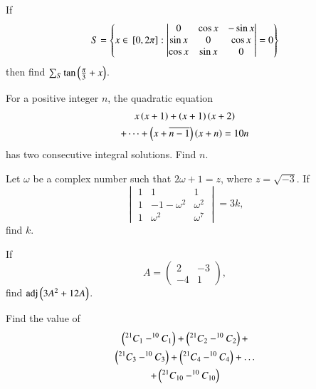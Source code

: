 \documentclass[journal,12pt,twocolumn]{IEEEtran}
\begin{document}
\begin{problem}
If
\begin{equation}
S = \left\{x \in {}\left[0,2\pi\right]: 
\begin{vmatrix}
0 & \cos x & -\sin x
\\
\sin x & 0 & \cos x
\\
\cos x & \sin x & 0
\end{vmatrix}=0\right\}
\end{equation}
then find
$\sum_{S}\tan\left(\frac{\pi}{3}+x\right)$.
\end{problem}
\begin{problem}
For a positive integer $n$, the quadratic equation 
\begin{multline}
x\left(x+1\right)+\left(x+1\right)\left(x+2\right)
\\
+\dots + \left(x + \overline{n-1}\right)\left(x+n\right) = 10n
\end{multline}
has two consecutive integral solutions.    Find $n$.
\end{problem}
%
%
\begin{problem}
Let $\omega$ be a complex number such that $2\omega + 1=z$, where $z = \sqrt{-3}$.  If
%
\begin{equation}
\begin{vmatrix}
1 & 1 & 1
\\
1 &-1 - \omega^2 & \omega^2
\\
1 & \omega^2 &\omega^7
\end{vmatrix}=3k,
\end{equation}
%
find $k$.
\end{problem}
\begin{problem}
If
\begin{equation}
A = 
\begin{pmatrix}
2 & -3
\\
-4 & 1
\end{pmatrix},
\end{equation}
find $\text{adj}\left(3A^2+12A\right)$.
\end{problem}
\begin{problem}
Find the value of
\begin{multline}
\left(^{21}C_{1} - ^{10}C_{1}\right) + \left(^{21}C_{2} - ^{10}C_{2}\right) +
\\
\left(^{21}C_{3} - ^{10}C_{3}\right) +\left(^{21}C_{4} - ^{10}C_{4}\right) + \dots
\\
+\left(^{21}C_{10} - ^{10}C_{10}\right) 
\end{multline}
\end{problem}
\end{document}
